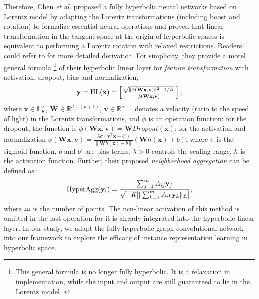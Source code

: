 \documentclass[sigconf]{acmart}
\newcommand{\etal}{{\emph{et al. }}}
\newcommand{\Lc}{\mathcal{L}}
\newcommand{\lorentz}{\mathbb{L}^n_K}
\newcommand{\lnorm}[1]{\lVert #1\rVert_\Lc}
\begin{document}
Therefore, Chen \etal \cite{c:16} proposed a fully hyperbolic neural networks based on Lorentz model by adapting the Lorentz transformations (including boost and rotation) to formalize essential neural operations and proved that linear transformation in the tangent space at the origin of hyperbolic spaces is equivalent to performing a Lorentz rotation with relaxed restrictions. Readers could refer to \cite{c:16} for more detailed derivation. For simplicity, they provide a morel general formula \footnote{This general formula is no longer fully hyperbolic. It is a relaxation in implementation, while the input and output are still guaranteed to lie in the Lorentz model \cite{c:16}.} of their hyperbolic linear layer for \emph{feature transformation} with activation, dropout, bias and normalization,
\begin{align}
\label{eq9}
   \mathbf{y} = {\rm HL}(\mathbf{x}) = \left[\begin{smallmatrix}
\sqrt{\lVert \phi(\mathbf{Wx, v}) \rVert^2 - 1/K}  \\
\phi(\mathbf{W}\mathbf{x}, \mathbf{v})
\end{smallmatrix}\right], 
\end{align}
where $\mathbf{x} \in\lorentz$, $\mathbf{W}\in\mathbb{R}^{d\times(n+1)}$, $\mathbf{v} \in \mathbb{R}^{n+1}$ denotes a velocity (ratio to the speed of light) in the Lorentz transformations, and $\phi$ is an operation function: for the dropout, the function is $\phi(\mathbf{Wx, v}) = \mathbf{W}{Dropout}(\mathbf{x})$; for the activation and normalization $\phi(\mathbf{Wx, v}) = \frac{\lambda \sigma(\mathbf{v}^\intercal\mathbf{x}+b')}{\lVert \mathbf{W}h(\mathbf{x})+b \rVert}(\mathbf{W}h(\mathbf{x})+b)$, where $\sigma$ is the sigmoid function, $b$ and $b'$ are bias terms, $\lambda > 0$ controls the scaling range, $h$ is the activation function. Further, their proposed \emph{neighborhood aggregation} can be defined as:
\begin{align}
\label{eq10}
    {\rm HyperAgg}(\mathbf{y}_i) = \frac{\sum_{j=1}^{m}A_{ij}\mathbf{y}_j}{\sqrt{-\textit{K}} \big | \lnorm{\sum_{k=1}^{m}A_{ik}\mathbf{y}_k} \big|} ,
\end{align}
where $\rm{m}$ is the number of points. The non-linear activation of this method is omitted in the last operation for it is already integrated into the hyperbolic linear layer. In our study, we adapt the fully hyperbolic graph convolutional network into our framework to explore the efficacy of instance representation learning in hyperbolic space.
\end{document}

